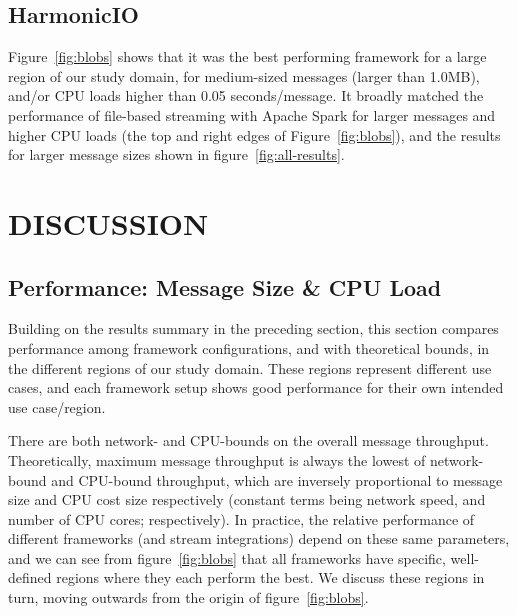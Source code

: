 \documentclass[conference]{IEEEtran}
\begin{document}
\subsection{HarmonicIO}
Figure~\ref{fig:blobs} shows that it was the best performing framework for a large region of our study domain, 
for medium-sized messages (larger than 1.0MB), and/or CPU loads higher than 0.05 seconds/message. It broadly matched the performance of file-based streaming with Apache Spark for larger messages and higher CPU loads (the top and right edges of Figure~\ref{fig:blobs}), and the results for larger message sizes shown in figure~\ref{fig:all-results}. 

\section{DISCUSSION}\label{discussion}

\subsection{Performance: Message Size \& CPU Load}


Building on the results summary in the preceding section, this section compares performance among framework configurations, and with theoretical bounds, in the different regions of our study domain. These regions represent different use cases, and each framework setup shows good performance for their own intended use case/region. 

There are both network- and CPU-bounds on the overall message throughput. Theoretically, maximum message throughput is always the lowest of network-bound and CPU-bound throughput, which are inversely proportional to message size and CPU cost size respectively (constant terms being network speed, and number of CPU cores; respectively). In practice, the relative performance of different frameworks (and stream integrations) depend on these same parameters, and we can see from figure~\ref{fig:blobs} that all frameworks have specific, well-defined regions where they each perform the best. We discuss these regions in turn, moving outwards from the origin of  figure~\ref{fig:blobs}. 
\end{document}
